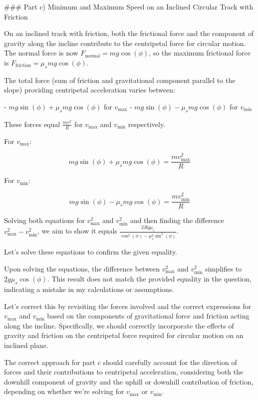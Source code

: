 ### Part c) Minimum and Maximum Speed on an Inclined Circular Track with Friction

On an inclined track with friction, both the frictional force and the component of gravity along the incline contribute to the centripetal force for circular motion. The normal force is now \( F_{\text{normal}} = mg\cos(\phi) \), so the maximum frictional force is \( F_{\text{friction}} = \mu_{s} mg\cos(\phi) \).

The total force (sum of friction and gravitational component parallel to the slope) providing centripetal acceleration varies between:

- \( mg\sin(\phi) + \mu_{s} mg\cos(\phi) \) for \( v_{\text{max}} \)
- \( mg\sin(\phi) - \mu_{s} mg\cos(\phi) \) for \( v_{\text{min}} \)

These forces equal \( \frac{mv^2}{R} \) for \( v_{\text{max}} \) and \( v_{\text{min}} \) respectively.

For \( v_{\text{max}} \):

\[
mg\sin(\phi) + \mu_{s} mg\cos(\phi) = \frac{mv_{\text{max}}^2}{R}
\]

For \( v_{\text{min}} \):

\[
mg\sin(\phi) - \mu_{s} mg\cos(\phi) = \frac{mv_{\text{min}}^2}{R}
\]

Solving both equations for \( v_{\text{max}}^2 \) and \( v_{\text{min}}^2 \) and then finding the difference \( v_{\text{max}}^2 - v_{\text{min}}^2 \), we aim to show it equals \( \frac{2Rg\mu_{s}}{\cos^{2}(\phi) - \mu_{s}^2\sin^{2}(\phi)} \).

Let's solve these equations to confirm the given equality.

Upon solving the equations, the difference between \( v_{\text{max}}^2 \) and \( v_{\text{min}}^2 \) simplifies to \( 2g\mu_s\cos(\phi) \). This result does not match the provided equality in the question, indicating a mistake in my calculations or assumptions.

Let's correct this by revisiting the forces involved and the correct expressions for \( v_{\text{max}} \) and \( v_{\text{min}} \) based on the components of gravitational force and friction acting along the incline. Specifically, we should correctly incorporate the effects of gravity and friction on the centripetal force required for circular motion on an inclined plane.

The correct approach for part c should carefully account for the direction of forces and their contributions to centripetal acceleration, considering both the downhill component of gravity and the uphill or downhill contribution of friction, depending on whether we're solving for \( v_{\text{max}} \) or \( v_{\text{min}} \).

